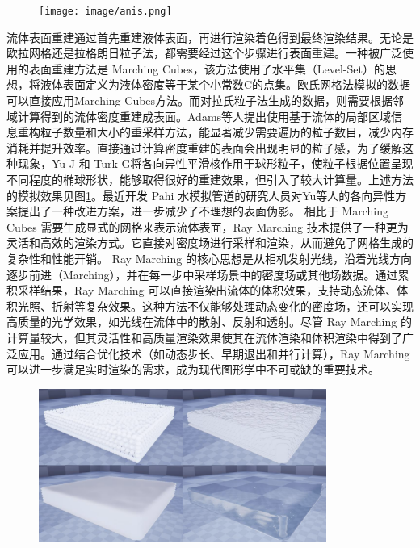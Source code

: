 \begin{figure}[ht]
 \centering
 \texttt{[image: image/anis.png]}
 \label{fig:anis}
\end{figure}

\indent 流体表面重建通过首先重建液体表面，再进行渲染着色得到最终渲染结果。无论是欧拉网格还是拉格朗日粒子法，都需要经过这个步骤进行表面重建。一种被广泛使用的表面重建方法是 Marching Cubes\cite{lorensen1998marching}，该方法使用了水平集（Level-Set）\cite{sethian2003level}的思想，将液体表面定义为液体密度等于某个小常数C的点集。欧氏网格法模拟的数据可以直接应用Marching Cubes方法。而对拉氏粒子法生成的数据，则需要根据邻域计算得到的流体密度重建成表面。Adams等人\cite{adams2007adaptively}提出使用基于流体的局部区域信息重构粒子数量和大小的重采样方法，能显著减少需要遍历的粒子数目，减少内存消耗并提升效率。直接通过计算密度重建的表面会出现明显的粒子感，为了缓解这种现象，Yu J 和 Turk G\cite{yu2013reconstructing}将各向异性平滑核作用于球形粒子，使粒子根据位置呈现不同程度的椭球形状，能够取得很好的重建效果，但引入了较大计算量。上述方法的模拟效果见图\ref{fig:anis}。最近开发 Pahi 水模拟管道的研究人员\cite{stomakhin2023pahi}对Yu等人的各向异性方案提出了一种改进方案，进一步减少了不理想的表面伪影。
相比于 Marching Cubes 需要生成显式的网格来表示流体表面，Ray Marching 技术\cite{hart1996sphere, wald2005interactive}提供了一种更为灵活和高效的渲染方式。它直接对密度场进行采样和渲染，从而避免了网格生成的复杂性和性能开销。
\newline
\indent Ray Marching 的核心思想是从相机发射光线，沿着光线方向逐步前进（Marching），并在每一步中采样场景中的密度场或其他场数据。通过累积采样结果，Ray Marching 可以直接渲染出流体的体积效果，支持动态流体、体积光照、折射等复杂效果。这种方法不仅能够处理动态变化的密度场，还可以实现高质量的光学效果，如光线在流体中的散射、反射和透射。尽管 Ray Marching 的计算量较大，但其灵活性和高质量渲染效果使其在流体渲染和体积渲染中得到了广泛应用。通过结合优化技术（如动态步长、早期退出和并行计算），Ray Marching 可以进一步满足实时渲染的需求，成为现代图形学中不可或缺的重要技术。 


\begin{figure}[ht]
 \centering
 \includegraphics[height=5cm]{image/ssr.png}
 \label{fig:ssr}
\end{figure}


